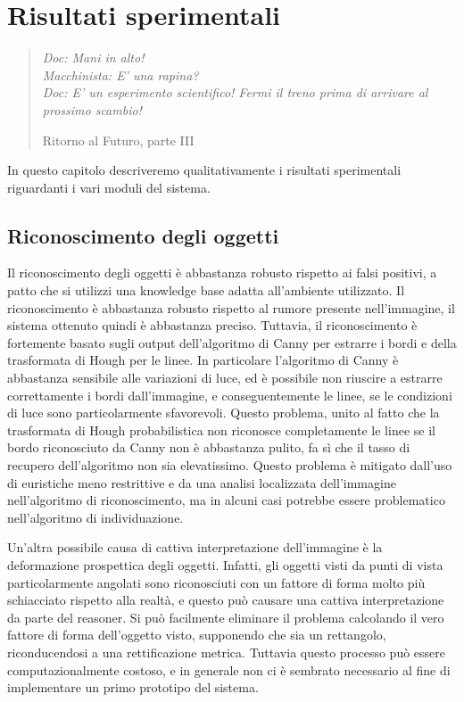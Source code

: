 \chapter{Risultati sperimentali}
\label{cap:risultati}
\thispagestyle{empty}

\begin{quotation}
{\footnotesize
\noindent\emph{Doc: Mani in alto! \\
Macchinista: E' una rapina? \\
Doc: E' un esperimento scientifico! Fermi il treno prima di arrivare al prossimo scambio!}
\begin{flushright}
Ritorno al Futuro, parte III
\end{flushright}
}
\end{quotation}
\vspace{0.5cm}

In questo capitolo descriveremo qualitativamente i risultati sperimentali riguardanti i vari moduli del sistema.

\section{Riconoscimento degli oggetti}
Il riconoscimento degli oggetti è abbastanza robusto rispetto ai falsi positivi, a patto che si utilizzi una knowledge base adatta all'ambiente utilizzato. Il riconoscimento è abbastanza robusto rispetto al rumore presente nell'immagine, il sistema ottenuto quindi è abbastanza preciso. 
Tuttavia, il riconoscimento è fortemente basato sugli output dell'algoritmo di Canny per estrarre i bordi e della trasformata di Hough per le linee. In particolare l'algoritmo di Canny è abbastanza sensibile alle variazioni di luce, ed è possibile non riuscire a estrarre correttamente i bordi dall'immagine, e conseguentemente le linee, se le condizioni di luce sono particolarmente sfavorevoli. Questo problema, unito al fatto che la trasformata di Hough probabilistica non riconosce completamente le linee se il bordo riconosciuto da Canny non è abbastanza pulito, fa sì che il tasso di recupero dell'algoritmo non sia elevatissimo. Questo problema è mitigato dall'uso di euristiche meno restrittive e da una analisi localizzata dell'immagine nell'algoritmo di riconoscimento, ma in alcuni casi potrebbe essere problematico nell'algoritmo di individuazione. 

Un'altra possibile causa di cattiva interpretazione dell'immagine è la deformazione prospettica degli oggetti. Infatti, gli oggetti visti da punti di vista particolarmente angolati sono riconosciuti con un fattore di forma molto più schiacciato rispetto alla realtà, e questo può causare una cattiva interpretazione da parte del reasoner. Si può facilmente eliminare il problema calcolando il vero fattore di forma dell'oggetto visto, supponendo che sia un rettangolo, riconducendosi a una rettificazione metrica. Tuttavia questo processo può essere computazionalmente costoso, e in generale non ci è sembrato necessario al fine di implementare un primo prototipo del sistema.


